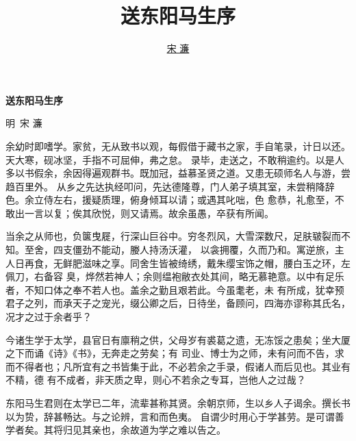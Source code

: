 \documentclass[a4paper]{article}
\title{送东阳马生序}
\author{\href{mailto:yangxks@gmail.com}{宋 濂}}
\newcommand{\zihao}{\fontsize{21pt}{\baselineskip}\selectfont}
\newcommand{\xiaochuhao}{\fontsize{36pt}{\baselineskip}\selectfont}
\newcommand{\xiaoerhao}{\fontsize{18pt}{\baselineskip}\selectfont}
\begin{document}
\zihao
\begin{center}
 {\bfseries\xiaochuhao 送东阳马生序}\\[1cm]
 \begin{flushright}
{\scshape\xiaoerhao 明\ 宋 濂}
 \end{flushright}
\end{center}


   余幼时即嗜学。家贫，无从致书以观，每假借于藏书之家，手自笔录，计日以还。天大寒，砚冰坚，手指不可屈伸，弗之怠。
录毕，走送之，不敢稍逾约。以是人多以书假余，余因得遍观群书。既加冠，益慕圣贤之道。又患无硕师名人与游，尝趋百里外。
从乡之先达执经叩问，先达德隆尊，门人弟子填其室，未尝稍降辞色。余立侍左右，援疑质理，俯身倾耳以请；或遇其叱咄，色
愈恭，礼愈至，不敢出一言以复；俟其欣悦，则又请焉。故余虽愚，卒获有所闻。


   当余之从师也，负箧曳屣，行深山巨谷中。穷冬烈风，大雪深数尺，足肤皲裂而不知。至舍，四支僵劲不能动，媵人持汤沃灌，
以衾拥覆，久而乃和。寓逆旅，主人日再食，无鲜肥滋味之享。同舍生皆被绮绣，戴朱缨宝饰之帽，腰白玉之环，左佩刀，右备容
臭，烨然若神人；余则缊袍敝衣处其间，略无慕艳意。以中有足乐者，不知口体之奉不若人也。盖余之勤且艰若此。今虽耄老，未
有所成，犹幸预君子之列，而承天子之宠光，缀公卿之后，日待坐，备顾问，四海亦谬称其氏名，况才之过于余者乎？


   今诸生学于太学，县官日有廪稍之供，父母岁有裘葛之遗，无冻馁之患矣；坐大厦之下而诵《诗》《书》，无奔走之劳矣；有
司业、博士为之师，未有问而不告，求而不得者也；凡所宜有之书皆集于此，不必若余之手录，假诸人而后见也。其业有不精，德
有不成者，非天质之卑，则心不若余之专耳，岂他人之过哉？

 
   东阳马生君则在太学已二年，流辈甚称其贤。余朝京师，生以乡人子谒余。撰长书以为贽，辞甚畅达。与之论辨，言和而色夷。
自谓少时用心于学甚劳。是可谓善学者矣。其将归见其亲也，余故道为学之难以告之。
\end{document}
